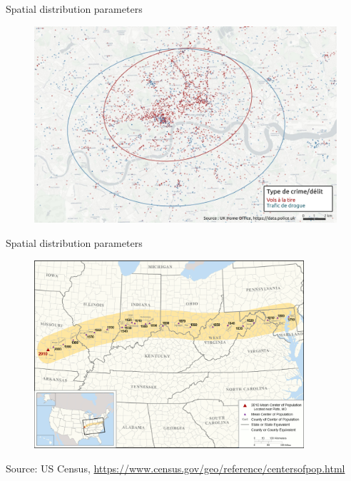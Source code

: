 \begin{frame}{Spatial distribution parameters}

\begin{figure}
\includegraphics[width=12cm]{Crimes.jpg}
\end{figure}

\end{frame}



\begin{frame}{Spatial distribution parameters}

\begin{figure}
\includegraphics[width=10cm]{Centerpop.png}
\end{figure}

\footnotesize
Source: US Census, \url{https://www.census.gov/geo/reference/centersofpop.html}
\normalsize

\end{frame}


